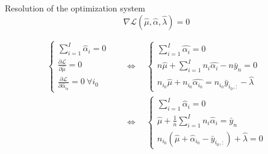 \documentclass[unknownkeysallowed]{beamer}
\begin{document}
\begin{frame}{Resolution of the optimization system}
\[\nabla \mathcal{L}(\hat\mu,\hat\alpha,\hat\lambda)=0\]

\[
\begin{aligned}
\begin{cases}
\sum\limits_{i=1}^{I}\hat{\alpha}_i=0 \\
\frac{\partial \mathcal{L}}{\partial \hat\mu}=0\\
\frac{\partial \mathcal{L}}{\partial \hat\alpha_{i_0}}=0\ \forall i_0
\end{cases}
\quad&\Longleftrightarrow\quad
\begin{cases}
\sum\limits_{i=1}^{I}\hat{\alpha_i}=0 \\
n\hat{\mu}+ \sum\limits_{i=1}^I n_i\hat{\alpha_i}-n\bar{y}_n=0\\
n_{i_0} \hat{\mu} +n_{i_0} \hat{\alpha_{i_0}} = n_{i_0}\bar{y}_{i_0,:} - \hat\lambda
\end{cases} \\
& \Longleftrightarrow\quad
\begin{cases}
\displaystyle\sum_{i=1}^{I}\hat{\alpha}_i=0  \\
\hat{\mu}+\frac{1}{n} \sum\limits_{i=1}^I n_i \hat{\alpha}_i=\bar{y}_n \\
n_{i_0}(\hat{\mu}+\hat{\alpha}_{i_0}-\bar{y}_{i_0,:}) +\hat{\lambda}=0 
\end{cases}
\end{aligned}
\]

\end{frame}

\end{document}
